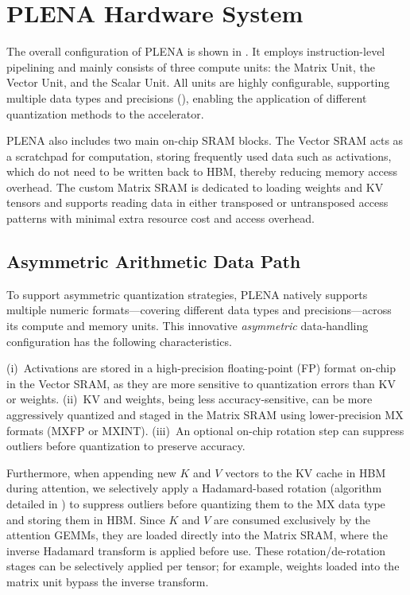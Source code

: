 



\section{PLENA Hardware System}

The overall configuration of PLENA is shown in . It employs instruction-level pipelining and mainly consists of three compute units: the Matrix Unit, the Vector Unit, and the Scalar Unit. All units are highly configurable, supporting multiple data types and precisions (), enabling the application of different quantization methods to the accelerator.

PLENA also includes two main on-chip SRAM blocks. The Vector SRAM acts as a scratchpad for computation, storing frequently used data such as activations, which do not need to be written back to HBM, thereby reducing memory access overhead. The custom Matrix SRAM is dedicated to loading weights and KV tensors and supports reading data in either transposed or untransposed access patterns with minimal extra resource cost and access overhead. 

\subsection{Asymmetric Arithmetic Data Path}
\label{sec:asymmetric}


To support asymmetric quantization strategies, PLENA natively supports multiple numeric formats---covering different data types and precisions---across its compute and memory units. This innovative \emph{asymmetric} data-handling configuration has the following characteristics.

(i)~Activations are stored in a high-precision floating-point (FP) format on-chip in the Vector SRAM, as they are more sensitive to quantization errors than KV or weights. (ii)~KV and weights, being less accuracy-sensitive, can be more aggressively quantized and staged in the Matrix SRAM using lower-precision MX formats (MXFP or MXINT). (iii)~An optional on-chip rotation step can suppress outliers before quantization to preserve accuracy.


Furthermore, when appending new \(K\) and \(V\) vectors to the KV cache in HBM during attention, we selectively apply a Hadamard-based rotation (algorithm detailed in ) to suppress outliers before quantizing them to the MX data type and storing them in HBM. Since \(K\) and \(V\) are consumed exclusively by the attention GEMMs, they are loaded directly into the Matrix SRAM, where the inverse Hadamard transform is applied before use. These rotation/de-rotation stages can be selectively applied per tensor; for example, weights loaded into the matrix unit bypass the inverse transform.



